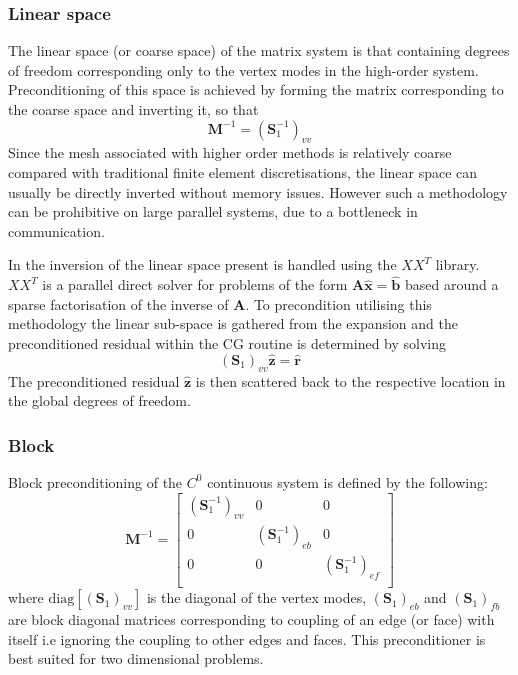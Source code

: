 \subsubsection{Linear space}

The linear space (or coarse space) of the matrix system is that containing
degrees of freedom corresponding only to the vertex modes in the high-order
system. Preconditioning of this space is achieved by forming the matrix
corresponding to the coarse space and inverting it, so that
%
\[
\mathbf{M}^{-1} = (\mathbf{S}^{-1}_{1})_{vv}
\]
%
Since the mesh associated with higher order methods is relatively coarse
compared with traditional finite element discretisations, the linear space can
usually be directly inverted without memory issues. However such a methodology
can be prohibitive on large parallel systems, due to a bottleneck in
communication.

In \nekpp the inversion of the linear space present is handled using the
$XX^{T}$ library. $XX^{T}$ is a parallel direct solver for problems of the form
$\mathbf{A}\hat{\mathbf{x}} = \hat{\mathbf{b}}$ based around a sparse
factorisation of the inverse of $\mathbf{A}$. To precondition utilising this
methodology the linear sub-space is gathered from the expansion and the
preconditioned residual within the CG routine is determined by solving
%
\[
(\mathbf{S}_{1})_{vv}\hat{\mathbf{z}}=\hat{\mathbf{r}}
\]
%
The preconditioned residual $\hat{\mathbf{z}}$ is then scattered back to the
respective location in the global degrees of freedom.

\subsubsection{Block}

Block preconditioning of the $C^0$ continuous system is defined by the
following:
%
\[
\mathbf{M}^{-1}=\left[ \begin{array}{ccc}
(\mathbf{S}^{-1}_{1})_{vv} & 0 & 0 \\
0 & (\mathbf{S}^{-1}_{1})_{eb} & 0\\
0 & 0 & (\mathbf{S}^{-1}_{1})_{ef}\\
 \end{array} \right]
\]
%
where $\mathrm{diag}[(\mathbf{S}_{1})_{vv}]$ is the diagonal of the vertex
modes, $(\mathbf{S}_{1})_{eb}$ and $(\mathbf{S}_{1})_{fb}$ are block diagonal
matrices corresponding to coupling of an edge (or face) with itself i.e ignoring
the coupling to other edges and faces. This preconditioner is best suited for
two dimensional problems.

